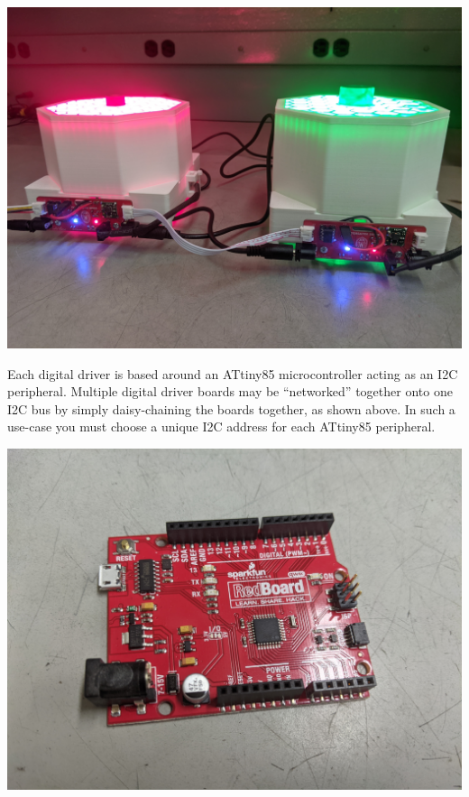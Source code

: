 \documentclass[11pt]{article}
\begin{document}
\begin{center}
  \includegraphics[width=\textwidth/2]{"./digital-wired.jpg"}
\end{center}

Each digital driver is based around an ATtiny85 microcontroller acting as an I2C peripheral.
Multiple digital driver boards may be ``networked'' together onto one I2C bus by simply daisy-chaining the boards together, as shown above.
In such a use-case you must choose a unique I2C address for each ATtiny85 peripheral.

\begin{center}
  \includegraphics[width=\textwidth/2]{"./redboard.jpg"}
\end{center}
\end{document}
